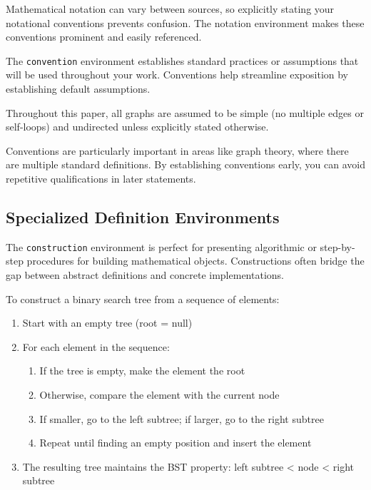 \documentclass[9pt]{amsart}
\begin{document}
Mathematical notation can vary between sources, so explicitly stating your
notational conventions prevents confusion. The notation environment makes these
conventions prominent and easily referenced.

The \texttt{convention} environment establishes standard practices or
assumptions that will be used throughout your work. Conventions help streamline
exposition by establishing default assumptions.

\begin{convention}
    Throughout this paper, all graphs are assumed to be simple (no multiple edges or self-loops) and undirected unless explicitly stated otherwise.
\end{convention}

Conventions are particularly important in areas like graph theory, where there
are multiple standard definitions. By establishing conventions early, you can
avoid repetitive qualifications in later statements.

\subsection{Specialized Definition Environments}

The \texttt{construction} environment is perfect for presenting algorithmic or
step-by-step procedures for building mathematical objects. Constructions often
bridge the gap between abstract definitions and concrete implementations.

\begin{construction}
    To construct a binary search tree from a sequence of elements:
    \begin{enumerate}
        \item Start with an empty tree (root = null)
        \item For each element in the sequence:
              \begin{enumerate}
                  \item If the tree is empty, make the element the root
                  \item Otherwise, compare the element with the current node
                  \item If smaller, go to the left subtree; if larger, go to the right subtree
                  \item Repeat until finding an empty position and insert the element
              \end{enumerate}
        \item The resulting tree maintains the BST property: left subtree < node < right
              subtree
    \end{enumerate}
\end{construction}
\end{document}
